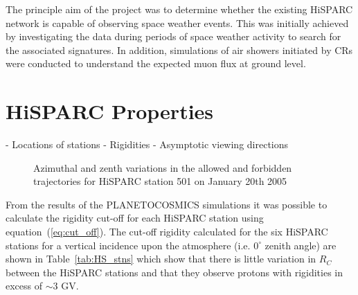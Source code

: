 The principle aim of the project was to determine whether the existing HiSPARC network is capable of observing space weather events. This was initially achieved by investigating the data during periods of space weather activity to search for the associated signatures. In addition, simulations of air showers initiated by CRs were conducted to understand the expected muon flux at ground level.


\section{HiSPARC Properties}\label{sec:HS_properties}
 - Locations of stations
 - Rigidities
 - Asymptotic viewing directions
 
 
\begin{figure}[ht]
	\centering
	
	\qquad
	
	
	\caption{ Azimuthal and zenth variations in the allowed and forbidden trajectories for HiSPARC station 501 on January 20th 2005 }
	\label{fig:R_C}
\end{figure}


From the results of the PLANETOCOSMICS simulations it was possible to calculate the rigidity cut-off for each HiSPARC station using equation~(\ref{eq:cut_off}). The cut-off rigidity calculated for the six HiSPARC stations for a vertical incidence upon the atmosphere (i.e. $0^\circ$ zenith angle) are shown in Table~\ref{tab:HS_stns} which show that there is little variation in $R_C$ between the HiSPARC stations and that they observe protons with rigidities in excess of $\sim 3$ GV. 


